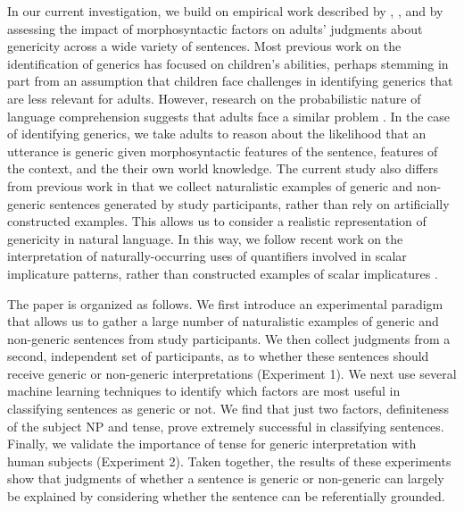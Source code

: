 \documentclass[10pt,letterpaper]{article}
\begin{document}

In our current investigation, we build on empirical work described by ,  , and  by assessing the impact of morphosyntactic factors on adults' judgments about genericity across a wide variety of sentences. Most previous work on the identification of generics has focused on children's abilities, perhaps stemming in part from an assumption that children face challenges in identifying generics that are less relevant for adults. However, research on the probabilistic nature of language comprehension suggests that adults face a similar problem \cite{Levy:2008,Frank:2012}. In the case of identifying generics, we take adults to reason about the likelihood that an utterance is generic given morphosyntactic features of the sentence, features of the context, and the their own world knowledge. The current study also differs from previous work in that we collect naturalistic examples of generic and non-generic sentences generated by study participants, rather than rely on artificially constructed examples. This allows us to consider a realistic representation of genericity in natural language. In this way, we follow recent work on the interpretation of naturally-occurring uses of quantifiers involved in scalar implicature patterns, rather than constructed examples of scalar implicatures \cite{Degen:2015}.

The paper is organized as follows. We first introduce an experimental paradigm that allows us to gather a large number of naturalistic examples of generic and non-generic sentences from study participants. We then collect judgments from a second, independent set of participants, as to whether these sentences should receive generic or non-generic interpretations (Experiment 1). We next use several machine learning techniques to identify which factors are most useful in classifying sentences as generic or not. We find that just two factors, definiteness of the subject NP and tense, prove extremely successful in classifying sentences. Finally, we validate the importance of tense for generic interpretation with human subjects (Experiment 2). Taken together, the results of these experiments show that judgments of whether a sentence is generic or non-generic can largely be explained by considering whether the sentence can be referentially grounded.
\end{document}
